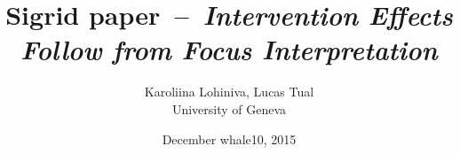 \documentclass[12pt,final,hyperref={pdfpagelabels=false}]{beamer}
\title[S. Beck - Intervention Effects]{\large Sigrid \raisebox{-.45\height}{\texttt{[image: becks.png]}} paper~--~\emph{Intervention Effects Follow from Focus Interpretation}}
\author{Karoliina Lohiniva, Lucas Tual\\University of Geneva}
\date{December whale10, 2015}
\begin{document}
\begin{frame}
\maketitle
\end{frame}

%
\end{document}
